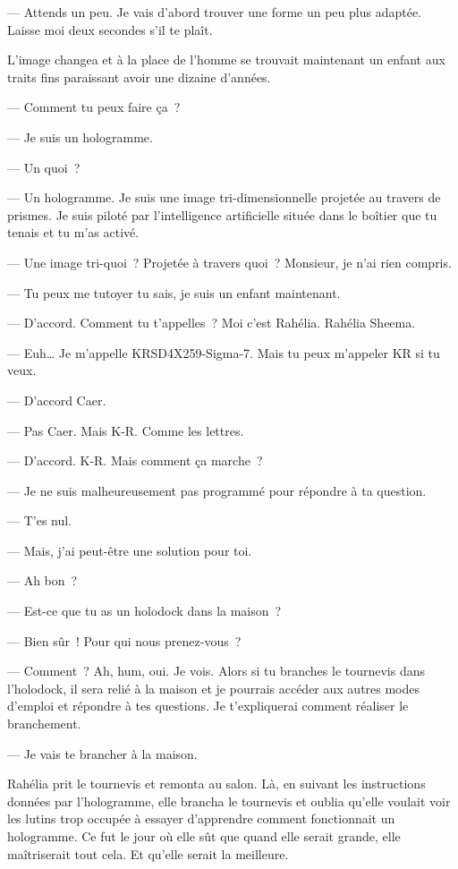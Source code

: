   — Attends un peu. Je vais d'abord trouver une forme un peu plus adaptée.
Laisse moi deux secondes s'il te plaît.

L'image changea et à la place de l'homme se trouvait maintenant un enfant aux
traits fins paraissant avoir une dizaine d'années.

  — Comment tu peux faire ça ?

  — Je suis un hologramme.

  — Un quoi ?

  — Un hologramme. Je suis une image tri-dimensionnelle projetée au
travers de prismes. Je suis piloté par l'intelligence artificielle située dans
le boîtier que tu tenais et tu m'as activé.

  — Une image tri-quoi ? Projetée à travers quoi ? Monsieur, je n'ai rien
compris.

  — Tu peux me tutoyer tu sais, je suis un enfant maintenant.

  — D'accord. Comment tu t'appelles ? Moi c'est Rahélia. Rahélia Sheema.

  — Euh… Je m'appelle KRSD4X259-Sigma-7. Mais tu peux m'appeler KR si tu veux.

  — D’accord Caer.

  — Pas Caer. Mais K-R. Comme les lettres.

  — D'accord. K-R. Mais comment ça marche ?

  — Je ne suis malheureusement pas programmé pour répondre à ta question.

  — T'es nul.

  — Mais, j'ai peut-être une solution pour toi.

  — Ah bon ?

  — Est-ce que tu as un holodock dans la maison ?

  — Bien sûr ! Pour qui nous prenez-vous ?

  — Comment ? Ah, hum, oui. Je vois. Alors si tu branches le tournevis
dans l'holodock, il sera relié à la maison et je pourrais accéder aux autres
modes d'emploi et répondre à tes questions. Je t'expliquerai comment réaliser le
branchement.

  — Je vais te brancher à la maison.

Rahélia prit le tournevis et remonta au salon. Là, en suivant les instructions
données par l'hologramme, elle brancha le tournevis et oublia qu'elle voulait
voir les lutins trop occupée à essayer d'apprendre comment fonctionnait un
hologramme. Ce fut le jour où elle sût que quand elle serait grande, elle
maîtriserait tout cela. Et qu'elle serait la meilleure.

